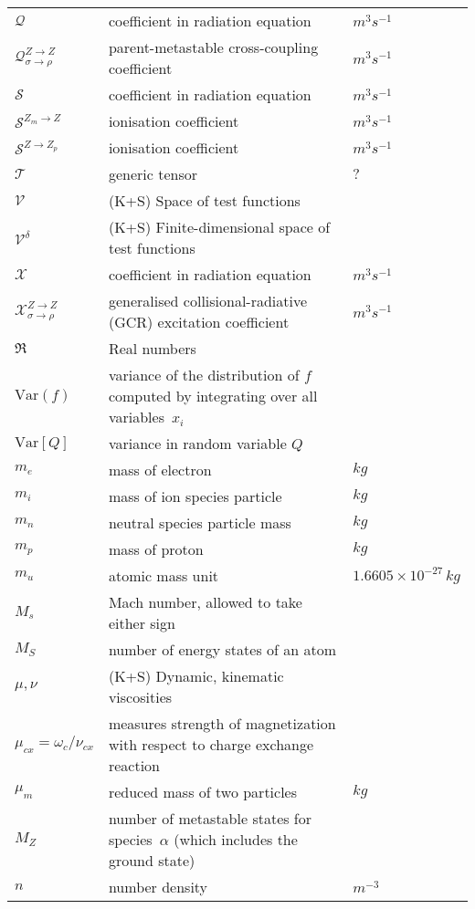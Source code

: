 \begin{longtable}{|p{3.0cm}|p{10.0cm}|p{3.0cm}|}
$\mathcal{Q}$ & coefficient in radiation equation  & $m^3 s^{-1}$ \\
$\mathcal{Q}_{\sigma \rightarrow \rho}^{Z\rightarrow Z}$ & parent-metastable cross-coupling coefficient  & $m^3 s^{-1}$ \\
$\mathcal{S}$ & coefficient in radiation equation  & $m^3 s^{-1}$ \\
$\mathcal{S}^{Z_m\rightarrow Z}$ & ionisation coefficient  & $m^3 s^{-1}$ \\
$\mathcal{S}^{Z\rightarrow Z_p}$ & ionisation coefficient  & $m^3 s^{-1}$ \\
$\mathcal{T}$ & generic tensor & $?$ \\
$\mathcal{V}$ &  (K+S) Space of test functions & \\
$\mathcal{V}^{\delta}$ &  (K+S) Finite-dimensional space of test functions & \\
$\mathcal{X}$ & coefficient in radiation equation  & $m^3 s^{-1}$ \\
$\mathcal{X}_{\sigma \rightarrow \rho}^{Z\rightarrow Z}$ & generalised collisional-radiative (GCR) excitation coefficient  & $m^3 s^{-1}$ \\
$\mathfrak{R}$ & Real numbers & \\
$\mathrm{Var}(f)$ & variance of the distribution of $f$ computed by integrating over all variables~$x_i$  & \\
$\mathrm{Var}[Q]$ & variance in random variable $Q$  & \\
$m_e$ & mass of electron & $kg$ \\
$m_i$ & mass of ion species particle & $kg$ \\
$m_n$ & neutral species particle mass & $kg$ \\
$m_p$ & mass of proton & $kg$ \\
$m_u$ & atomic mass unit & $1.6605 \times 10^{-27}\,kg$ \\
$M_s$ & Mach number, allowed to take either sign & \\
$M_S$ & number of energy states of an atom & \\
$\mu, \nu$ &  (K+S) Dynamic, kinematic viscosities & \\
$\mu_{cx}=\omega_c/\nu_{cx}$ & measures strength of magnetization with respect to charge exchange reaction & \\
$\mu_m$ & reduced mass of two particles & $kg$ \\
$M_Z$ & number of metastable states for species~$\alpha$ (which includes the ground state) & \\
$n$ & number density & $m^{-3}$ \\

\end{longtable}
